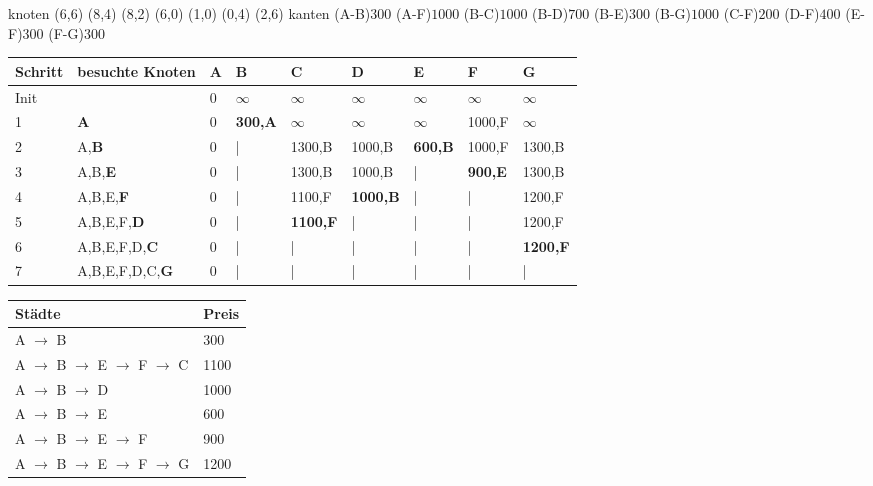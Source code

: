 \documentclass{lehramt-informatik-haupt}
\begin{document}
\graph knoten {
  (6,6)
  (8,4)
  (8,2)
  (6,0)
  (1,0)
  (0,4)
  (2,6)
} kanten {
  \kante(A-B){$300$}
  \kante(A-F){$1000$}
  \kante(B-C){$1000$}
  \kante(B-D){$700$}
  \kante(B-E){$300$}
  \kante(B-G){$1000$}
  \kante(C-F){$200$}
  \kante(D-F){$400$}
  \kante(E-F){$300$}
  \kante(F-G){$300$}
}

\noindent
\begin{tabular}{|l|l|l|l|l|l|l|l|l|}
\hline
Schritt & besuchte Knoten & A & B & C & D & E & F & G \\\hline\hline

Init &
& %
0 & %
$\infty$ & %
$\infty$ & %
$\infty$ & %
$\infty$ & %
$\infty$ & %
$\infty$ \\\hline%

1 &
\textbf{A} & %
0 & %
\textbf{300,A} & %
$\infty$ & %
$\infty$ & %
$\infty$ & %
1000,F & %
$\infty$ \\\hline%

2 &
A,\textbf{B} & %
0 & %
| & %
1300,B & %
1000,B & %
\textbf{600,B} & %
1000,F & %
1300,B \\\hline%

3 &
A,B,\textbf{E} & %
0 & %
| & %
1300,B & %
1000,B & %
| & %
\textbf{900,E} & %
1300,B \\\hline%

4 &
A,B,E,\textbf{F} & %
0 & %
| & %
1100,F & %
\textbf{1000,B} & %
| & %
| & %
1200,F \\\hline%

5 &
A,B,E,F,\textbf{D} & %
0 & %
| & %
\textbf{1100,F} & %
| & %
| & %
| & %
1200,F \\\hline%

6 &
A,B,E,F,D,\textbf{C} & %
0 & %
| & %
| & %
| & %
| & %
| & %
\textbf{1200,F} \\\hline%

7 &
A,B,E,F,D,C,\textbf{G} & %
0 & %
| & %
| & %
| & %
| & %
| & %
| \\\hline%
\end{tabular}

\noindent
\begin{tabular}{|l|l|}
\hline
Städte & Preis\\\hline\hline
A $\rightarrow$ B & 300 \\\hline
A $\rightarrow$ B $\rightarrow$ E $\rightarrow$ F $\rightarrow$ C & 1100 \\\hline
A $\rightarrow$ B $\rightarrow$ D & 1000 \\\hline
A $\rightarrow$ B $\rightarrow$ E & 600 \\\hline
A $\rightarrow$ B $\rightarrow$ E $\rightarrow$ F & 900 \\\hline
A $\rightarrow$ B $\rightarrow$ E $\rightarrow$ F $\rightarrow$ G & 1200 \\\hline
\end{tabular}
\end{document}

